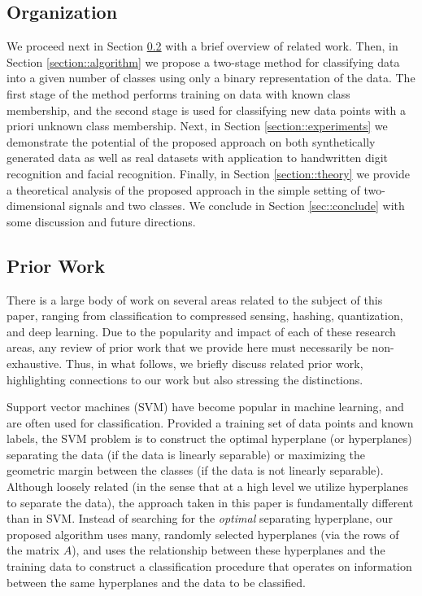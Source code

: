 \documentclass[twoside,11pt]{article}
\newcommand{\edit}[1]{{{#1}}}
\begin{document}
\subsection{Organization} We proceed next in Section \ref{sec:prior} with a brief overview of related work. Then, in Section \ref{section::algorithm} we propose a two-stage method for classifying data into a given number of classes using only a binary representation of the data. The first stage of the method performs training on data with known class membership, and the second stage is used for classifying new data points with a priori unknown class membership. Next, in Section \ref{section::experiments} we demonstrate the potential of the proposed approach on both synthetically generated data as well as real datasets with application to handwritten digit recognition and facial recognition. Finally, in Section \ref{section::theory} we provide a theoretical analysis of the proposed approach in the simple setting of two-dimensional signals and two classes. We conclude in Section \ref{sec::conclude} with some discussion and future directions.

\subsection{Prior Work}\label{sec:prior}

There is a large body of work on several areas related to the subject of this paper, ranging from classification to compressed sensing, hashing, quantization, and deep learning. Due to the popularity and impact of each of these research areas, any review of prior work that we provide here must necessarily be non-exhaustive. Thus, in what follows, we briefly discuss related prior work, highlighting connections to our work but also stressing the distinctions. 



Support vector machines (SVM) \citep{CristS_Introduction, hearst1998support, joachims1998text, steinwart2008support} have become popular in machine learning, and are often used for classification. Provided a training set of data points and known labels, the SVM problem is to construct the optimal hyperplane (or hyperplanes) separating the data (if the data is linearly separable) or maximizing the geometric margin between the classes (if the data is not linearly separable). Although \edit{loosely} related \edit{(in the sense that at a high level we utilize hyperplanes to separate the data)}, the approach taken in this paper is fundamentally different than in SVM. Instead of searching for the \textit{optimal} separating hyperplane, our proposed algorithm uses many, randomly selected hyperplanes (via the rows of the matrix $A$), and uses the relationship between these hyperplanes and the training data to construct a classification procedure that operates on information between the same hyperplanes and the data to be classified. 
\end{document}
